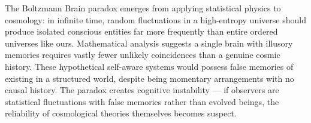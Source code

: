 The Boltzmann Brain paradox emerges from applying statistical physics to cosmology: in infinite time, random fluctuations in a high-entropy universe should produce isolated conscious entities far more frequently than entire ordered universes like ours. Mathematical analysis suggests a single brain with illusory memories requires vastly fewer unlikely coincidences than a genuine cosmic history. These hypothetical self-aware systems would possess false memories of existing in a structured world, despite being momentary arrangements with no causal history. The paradox creates cognitive instability — if observers are statistical fluctuations with false memories rather than evolved beings, the reliability of cosmological theories themselves becomes suspect.

